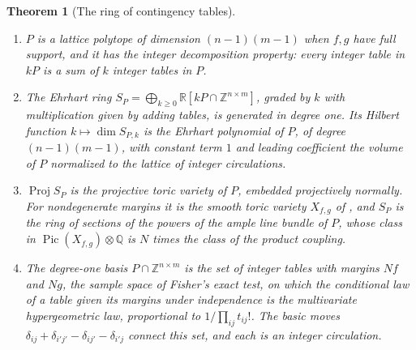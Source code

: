 \documentclass[11pt]{article}
\newtheorem{theorem}{Theorem}[section]
\theoremstyle{definition}
\theoremstyle{remark}
\newcommand{\R}{\mathbb{R}}
\newcommand{\Z}{\mathbb{Z}}
\begin{document}
\begin{theorem}[The ring of contingency tables]\label{thm:ehrhart}
\begin{enumerate}[label=(\roman*)]
\item $P$ is a lattice polytope of dimension $(n-1)(m-1)$ when $f,g$ have full support, and it has the integer
  decomposition property: every integer table in $kP$ is a sum of $k$ integer tables in $P$.
\item The Ehrhart ring $S_P=\bigoplus_{k\ge0}\R[kP\cap\Z^{n\times m}]$, graded by $k$ with multiplication given by adding tables, is
  generated in degree one. Its Hilbert function $k\mapsto\dim S_{P,k}$ is the Ehrhart polynomial of $P$, of degree
  $(n-1)(m-1)$, with constant term $1$ and leading coefficient the volume of $P$ normalized to the lattice of integer
  circulations.
\item $\operatorname{Proj}S_P$ is the projective toric variety of $P$, embedded projectively normally. For nondegenerate
  margins it is the smooth toric variety $X_{f,g}$ of \cite[Thm.~6.4]{Conditionals}, and $S_P$ is the ring of sections of the powers
  of the ample line bundle of $P$, whose class in $\operatorname{Pic}(X_{f,g})\otimes\mathbb Q$ is $N$ times the class of the product coupling.
\item The degree-one basis $P\cap\Z^{n\times m}$ is the set of integer tables with margins $Nf$ and $Ng$, the sample space of
  Fisher's exact test, on which the conditional law of a table given its margins under independence is the multivariate
  hypergeometric law, proportional to $1/\prod_{ij}t_{ij}!$. The basic moves $\delta_{ij}+\delta_{i'j'}-\delta_{ij'}-\delta_{i'j}$
  connect this set, and each is an integer circulation.
\end{enumerate}
\end{theorem}
\end{document}
